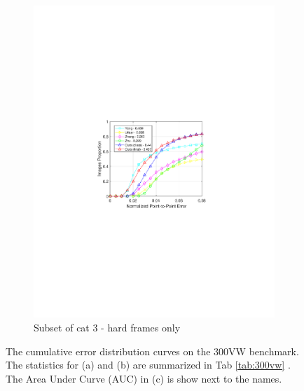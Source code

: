 \documentclass[letterpaper]{article} %
\begin{document}
\begin{figure}[t]
\begin{subfigure}[b]{0.3\textwidth}
            \includegraphics[width=\textwidth]{fig/HardCurve.pdf}
            \caption{{\small Subset of cat 3 - hard frames only}}
            \label{fig:test6}
        \end{subfigure}
    \caption{\small The cumulative error distribution curves on the 300VW benchmark. The statistics for (a) and (b) are summarized in Tab \ref{tab:300vw} . The Area Under Curve (AUC) in (c) is show next to the names.}
    \label{fig:curves}
\end{figure}

%
\end{document}
